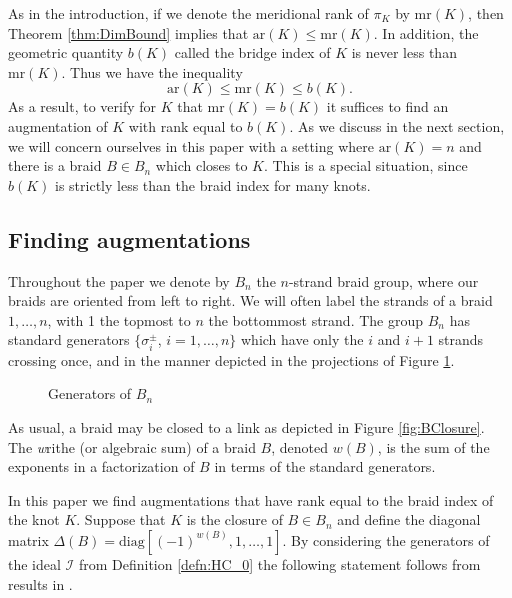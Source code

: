 \documentclass[11pt]{amsart}
\begin{document}
  As in the introduction, if we denote the meridional rank of $\pi_K$ by $\text{mr}(K)$, then Theorem \ref{thm:DimBound} implies that $\text{ar}(K)\le\text{mr}(K)$. In addition, the geometric quantity $b(K)$ called the bridge index of $K$ is never less than $\text{mr}(K)$. Thus we have the inequality 
    \[\text{ar}(K)\le\text{mr}(K)\le b(K).\]
  As a result, to verify for $K$ that $\text{mr}(K)=b(K)$ it suffices to find an augmentation of $K$ with rank equal to $b(K)$. As we discuss in the next section, we will concern ourselves in this paper with a setting where $\text{ar}(K)=n$ and there is a braid $B\in B_n$ which closes to $K$. This is a special situation, since $b(K)$ is strictly less than the braid index for many knots.

\subsection{Finding augmentations}
\label{SecBG_AugExist}
  Throughout the paper we denote by $B_n$ the $n$-strand braid group, where our braids are oriented from left to right. We will often label the strands of a braid $1,\ldots, n$, with 1 the topmost to $n$ the bottommost strand. The group $B_n$ has standard generators $\{\sigma_i^{\pm}$, $i=1,\ldots,n\}$ which have only the $i$ and $i+1$ strands crossing once, and in the manner depicted in the projections of Figure \ref{fig:BraidGens}.
    \begin{figure}[ht]
      \caption{Generators of $B_n$}
      \label{fig:BraidGens}
    \end{figure}
  As usual, a braid may be closed to a link as depicted in Figure \ref{fig:BClosure}. The {\emph writhe} (or algebraic sum) of a braid $B$, denoted $w(B)$, is the sum of the exponents in a factorization of $B$ in terms of the standard generators.

  In this paper we find augmentations that have rank equal to the braid index of the knot $K$. Suppose that $K$ is the closure of $B\in B_n$ and define the diagonal matrix $\Delta(B)=\text{diag}[(-1)^{w(B)},1,\ldots,1]$. By considering the generators of the ideal $\mathcal I$ from Definition \ref{defn:HC_0} the following statement follows from results in \cite[Section 5]{Cor13b}.
\end{document}
